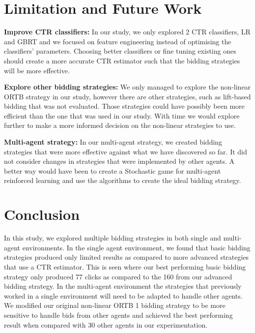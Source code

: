 \documentclass{sig-alternate-05-2015}
\begin{document}
\section{Limitation and Future Work}
\textbf{Improve CTR classifiers:}
In our study, we only explored 2 CTR classifiers, LR and GBRT and we focused on feature engineering instead of optimising the classifiers' parameters. Choosing better classifiers or fine tuning existing ones should create a more accurate CTR estimator such that the bidding strategies will be more effective. 

\textbf{Explore other bidding strategies:}
We only managed to explore the non-linear ORTB strategy in our study, however there are other strategies, such as lift-based bidding\cite{xu_lift-based_2015} that was not evaluated. Those strategies could have possibly been more efficient than the one that was used in our study. With time we would explore further to make a more informed decision on the non-linear strategies to use.

\textbf{Multi-agent strategy:}
In our multi-agent strategy, we created bidding strategies that were more effective against what we have discovered so far. It did not consider changes in strategies that were implemented by other agents. A better way would have been to create a Stochastic game for multi-agent reinforced learning \cite{jin_multiagent_2018} and use the algorithms to create the ideal bidding strategy. 

\section{Conclusion}
In this study, we explored multiple bidding strategies in both single and multi-agent environments. In the single agent environment, we found that basic bidding strategies produced only limited results as compared to more advanced strategies that use a CTR estimator. This is seen where our best performing basic bidding strategy only produced 77 clicks as compared to the 160 from our advanced bidding strategy. In the multi-agent environment the strategies that previously worked in a single environment will need to be adapted to handle other agents. We modified our original non-linear ORTB 1 bidding strategy to be more sensitive to handle bids from other agents and achieved the best performing result when compared with 30 other agents in our experimentation. 

\clearpage
\newpage

  
\end{document}
